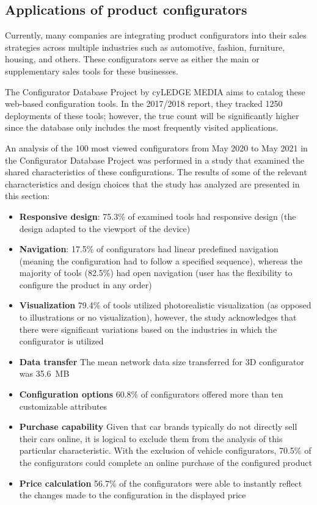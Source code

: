 \subsection{Applications of product configurators}

Currently, many companies are integrating product configurators into their sales strategies across multiple industries such as automotive, fashion, furniture, housing, and others. These configurators serve as either the main or supplementary sales tools for these businesses.

The Configurator Database Project by cyLEDGE MEDIA aims to catalog these web-based configuration tools. In the 2017/2018 report, they tracked 1250 deployments of these tools; however, the true count will be significantly higher since the database only includes the most frequently visited applications. \cite{cyLEDGE2018}

An analysis of the 100 most viewed configurators from May 2020 to May 2021 in the Configurator Database Project was performed in a study that examined the shared characteristics of these configurations. The results of some of the relevant characteristics and design choices that the study has analyzed are presented in this section: \cite{Blazek2023}
\begin{itemize}
    \item \textbf{Responsive design}: 75.3\% of examined tools had responsive design (the design adapted to the viewport of the device) 
    \item \textbf{Navigation}: 17.5\% of configurators had linear predefined navigation (meaning the configuration had to follow a specified sequence), whereas the majority of tools (82.5\%) had open navigation (user has the flexibility to configure the product in any order)
    \item \textbf{Visualization} 79.4\% of tools utilized photorealistic visualization (as opposed to illustrations or no visualization), however, the study acknowledges that there were significant variations based on the industries in which the configurator is utilized
    \item \textbf{Data transfer} The mean network data size transferred for 3D configurator was 35.6~MB
    \item \textbf{Configuration options} 60.8\% of configurators offered more than ten customizable attributes
    \item \textbf{Purchase capability} Given that car brands typically do not directly sell their cars online, it is logical to exclude them from the analysis of this particular characteristic. With the exclusion of vehicle configurators, 70.5\% of the configurators could complete an online purchase of the configured product
    \item \textbf{Price calculation} 56.7\% of the configurators were able to instantly reflect the changes made to the configuration in the displayed price
\end{itemize}

